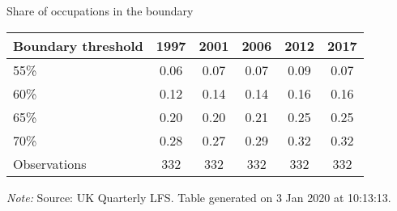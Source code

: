 \begin{center}
\begin{threeparttable}[!h]
\caption{Share of occupations in the boundary}
\label{tab:shareBound}
\begin{tabular}{lccccc}
\toprule
\toprule
\textbf{Boundary threshold}&\multicolumn{1}{c}{\textbf{1997}}&\multicolumn{1}{c}{\textbf{2001}}&\multicolumn{1}{c}{\textbf{2006}}&\multicolumn{1}{c}{\textbf{2012}}&\multicolumn{1}{c}{\textbf{2017}} \\
\midrule
55\%        &        0.06&        0.07&        0.07&        0.09&        0.07\\
60\%        &        0.12&        0.14&        0.14&        0.16&        0.16\\
65\%        &        0.20&        0.20&        0.21&        0.25&        0.25\\
70\%        &        0.28&        0.27&        0.29&        0.32&        0.32\\
\midrule Observations&         332&         332&         332&         332&         332\\
\bottomrule
\bottomrule
\end{tabular}
\begin{tablenotes}
\item\footnotesize\textit{Note:} Source: UK Quarterly LFS. Table generated on  3 Jan 2020 at 10:13:13.
\end{tablenotes}
\end{threeparttable}
\end{center}
